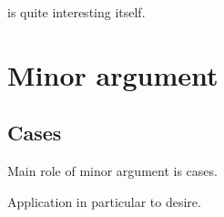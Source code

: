 \begin{note}
  \mcB{} is quite interesting itself.
\end{note}

\section{Minor argument}
\label{sec:posit-argumn-overv}

\subsection{Cases}
\label{sec:cases}

\begin{note}
  Main role of minor argument is cases.
\end{note}

\begin{note}
  Application in particular to desire.
\end{note}